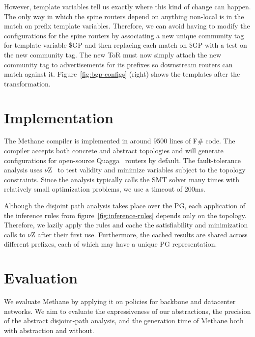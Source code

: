 \documentclass[numbers, 10pt, preprint]{sigplanconf}
\newcommand{\sysname}{{\small \sf Methane}\xspace}
\begin{document}
However, template variables tell us exactly where this kind of change can happen. The only way in which the spine routers depend on anything non-local is in the match on prefix template variables. Therefore, we can avoid having to modify the configurations for the spine routers by associating a new unique community tag for template variable {\small \$GP} and then replacing each match on {\small \$GP} with a test on the new community tag. The new ToR must now simply attach the new community tag to advertisements for its prefixes so downstream routers can match against it. Figure~\ref{fig:bgp-configs} (right) shows the templates after the transformation.




%
%
%
%

\section{Implementation}
\label{sec:implementation}

The \sysname compiler is implemented in around 9500 lines of F\# code. The compiler accepts both concrete and abstract topologies and will generate configurations for open-source Quagga~\cite{quagga} routers by default. The fault-tolerance analysis uses $\nu$Z~\cite{z3opt} to test validity and minimize variables subject to the topology constraints. Since the analysis typically calls the SMT solver many times with relatively small optimization problems, we use a timeout of 200ms.

Although the disjoint path analysis takes place over the PG, each application of the inference rules from figure~\ref{fig:inference-rules} depends only on the topology. Therefore, we lazily apply the rules and cache the satisfiability and minimization calls to $\nu$Z after their first use. Furthermore, the cached results are shared across different prefixes, each of which may have a unique PG representation.

\section{Evaluation}
\label{sec:evaluation}

We evaluate \sysname by applying it on policies for backbone and datacenter networks. We aim to evaluate the expressiveness of our abstractions, the precision of the abstract disjoint-path analysis, and the generation time of \sysname both with abstraction and without.
\end{document}
